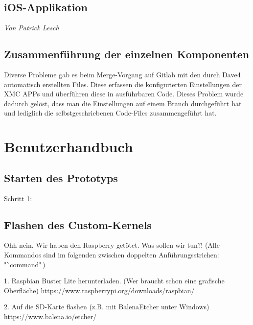 \documentclass[12pt,a4paper,bibliography=totoc,listof=totoc]{scrartcl}
\begin{document}
\subsection{iOS-Applikation}
\textit{Von Patrick Lesch}\newline


\subsection{Zusammenführung der einzelnen Komponenten}
Diverse Probleme gab es beim Merge-Vorgang auf Gitlab mit den durch Dave4 automatisch erstellten Files. 
Diese erfassen die konfigurierten Einstellungen der XMC APPs und überführen diese in ausführbaren Code. 
Dieses Problem wurde dadurch gelöst, dass man die Einstellungen auf einem Branch durchgeführt hat und 
lediglich die selbstgeschriebenen Code-Files zusammengeführt hat.

\pagebreak
\section{Benutzerhandbuch}
\subsection{Starten des Prototyps}
Schritt 1:
\newline

\subsection{Flashen des Custom-Kernels}
Ohh nein. Wir haben den Raspberry getötet. Was sollen wir tun?!
(Alle Kommandos sind im folgenden zwischen doppelten Anführungsstrichen: "`command"\,)

1. Raspbian Buster Lite herunterladen. (Wer braucht schon eine grafische Oberfläche)
   https://www.raspberrypi.org/downloads/raspbian/
\newline

2. Auf die SD-Karte flashen (z.B. mit BalenaEtcher unter Windows)\newline
   https://www.balena.io/etcher/
\newline
\end{document}
